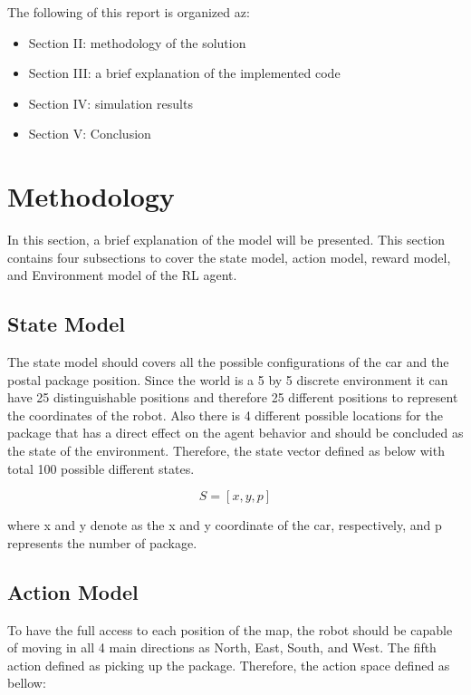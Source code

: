 \documentclass[lettersize,journal]{IEEEtran}
\begin{document}
The following of this report is organized az:
\begin{itemize}
    \item Section II: methodology of the solution
    \item Section III: a brief explanation of the implemented code
    \item Section IV: simulation results
    \item Section V: Conclusion
\end{itemize}
\vspace{0.3cm}


\section{Methodology}
In this section, a brief explanation of the model will be presented. This section contains four subsections to cover the state model, action model, reward model, and Environment model of the RL agent.\par

\subsection{State Model}
The state model should covers all the possible configurations of the car and the postal package position. Since the world is a 5 by 5 discrete environment it can have 25 distinguishable positions and therefore 25 different positions to represent the coordinates of the robot. Also there is 4 different possible locations for the package that has a direct effect on the agent behavior and should be concluded as the state of the environment. Therefore, the state vector defined as below with total 100 possible different states.

\begin{equation}
S = [x, y, p]
\end{equation}

where x and y denote as the x and y coordinate of the car, respectively, and p represents the number of package.

\subsection{Action Model}
To have the full access to each position of the map, the robot should be capable of moving in all 4 main directions as North, East, South, and West. The fifth action defined as picking up the package. Therefore, the action space defined as bellow:
\end{document}
